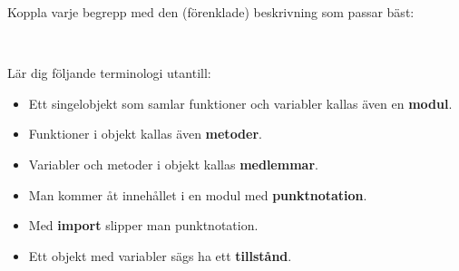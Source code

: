 

\ifPreSolution


\Exercise{\ExeWeekFOUR}\label{exe:W04}
\begin{Goals}

\end{Goals}

\begin{Preparations}
\item {}
\end{Preparations}

\else

\ExerciseSolution{\ExeWeekFOUR}

\fi



\BasicTasks %






\QUESTBEGIN

\Task \what

\vspace{1em}\noindent Koppla varje begrepp med den (förenklade) beskrivning som passar bäst:

\begin{ConceptConnections}

\end{ConceptConnections}

\SOLUTION

\TaskSolved \what

\begin{ConceptConnections}

\end{ConceptConnections}

\QUESTEND






\QUESTBEGIN

\Task  \what~  

\Subtask Lär dig följande terminologi utantill:

\begin{itemize}[noitemsep, nolistsep]
\item Ett singelobjekt som samlar funktioner och variabler kallas även en \textbf{modul}.
\item Funktioner i objekt kallas även \textbf{metoder}.
\item Variabler och metoder i objekt kallas \textbf{medlemmar}.
\item Man kommer åt innehållet i en modul med \textbf{punktnotation}.
\item Med \textbf{import} slipper man punktnotation.
\item Ett objekt med variabler sägs ha ett \textbf{tillstånd}.
\end{itemize}


